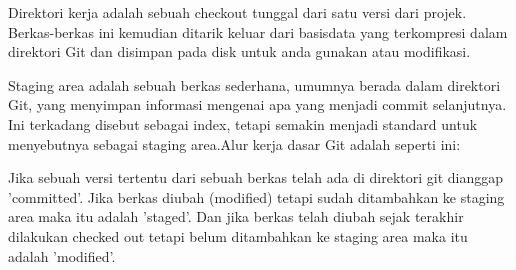 \noindent 
Direktori kerja adalah sebuah checkout tunggal dari satu versi dari projek. Berkas-berkas ini kemudian ditarik keluar dari basisdata yang terkompresi dalam direktori Git dan disimpan pada disk untuk anda gunakan atau modifikasi. \par
Staging area adalah sebuah berkas sederhana, umumnya berada dalam direktori Git, yang menyimpan informasi mengenai apa yang menjadi commit selanjutnya. Ini terkadang disebut sebagai index, tetapi semakin menjadi standard untuk menyebutnya sebagai staging area.Alur kerja dasar Git adalah seperti ini: \par
\noindent 
 \par
Jika sebuah versi tertentu dari sebuah berkas telah ada di direktori git dianggap 'committed'. Jika berkas diubah (modified) tetapi sudah ditambahkan ke staging area  maka itu adalah 'staged'. Dan jika berkas telah diubah sejak terakhir dilakukan checked out tetapi belum ditambahkan ke staging area maka itu adalah 'modified'.  \par
\noindent 
